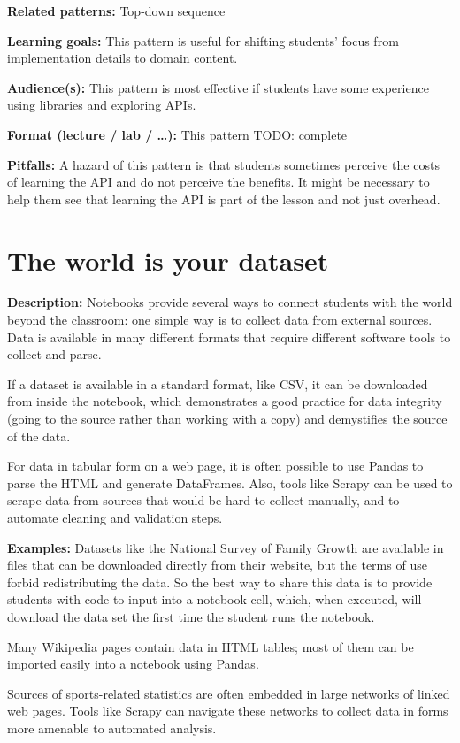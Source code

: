 \documentclass[]{book}
\begin{document}
\textbf{Related patterns:} Top-down sequence

\textbf{Learning goals:} This pattern is useful for shifting students'
focus from implementation details to domain content.

\textbf{Audience(s):} This pattern is most effective if students have
some experience using libraries and exploring APIs.

\textbf{Format (lecture / lab / \ldots{}):} This pattern TODO: complete

\textbf{Pitfalls:} A hazard of this pattern is that students sometimes
perceive the costs of learning the API and do not perceive the benefits.
It might be necessary to help them see that learning the API is part of
the lesson and not just overhead.

\section{The world is your dataset}\label{the-world-is-your-dataset}

\textbf{Description:} Notebooks provide several ways to connect students
with the world beyond the classroom: one simple way is to collect data
from external sources. Data is available in many different formats that
require different software tools to collect and parse.

If a dataset is available in a standard format, like CSV, it can be
downloaded from inside the notebook, which demonstrates a good practice
for data integrity (going to the source rather than working with a copy)
and demystifies the source of the data.

For data in tabular form on a web page, it is often possible to use
Pandas to parse the HTML and generate DataFrames. Also, tools like
Scrapy can be used to scrape data from sources that would be hard to
collect manually, and to automate cleaning and validation steps.

\textbf{Examples:} Datasets like the National Survey of Family Growth
are available in files that can be downloaded directly from their
website, but the terms of use forbid redistributing the data. So the
best way to share this data is to provide students with code to input
into a notebook cell, which, when executed, will download the data set
the first time the student runs the notebook.

Many Wikipedia pages contain data in HTML tables; most of them can be
imported easily into a notebook using Pandas.

Sources of sports-related statistics are often embedded in large
networks of linked web pages. Tools like Scrapy can navigate these
networks to collect data in forms more amenable to automated analysis.
\end{document}
